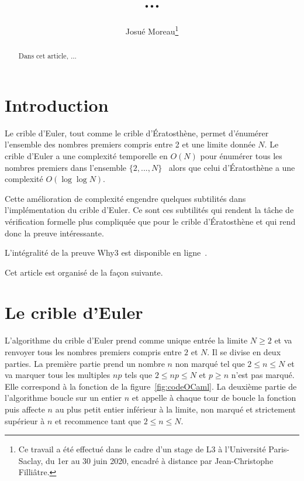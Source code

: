 \documentclass[a4paper]{easychair}
\begin{document}
\title{...}
\author{Josué Moreau\thanks{Ce travail a été effectué dans le cadre
    d'un stage de L3 à l'Université Paris-Saclay, du 1er au 30 juin
    2020, encadré à distance par Jean-Christophe Filliâtre.}}
\maketitle

\begin{abstract}
  Dans cet article, ...
\end{abstract}

\section{Introduction}


Le crible d'Euler, tout comme le crible d'Ératosthène, permet d'énumérer
l'ensemble des nombres premiers compris entre 2 et une limite donnée $N$.
Le crible d'Euler a une complexité temporelle en $O(N)$ pour énumérer tous les
nombres premiers dans l'ensemble $\{2,...,N\}$~\cite{crible-euler} alors que celui
d'Ératosthène a une complexité $O(\log\log N)$.

Cette amélioration de complexité engendre quelques subtilités dans l'implémentation
du crible d'Euler. Ce sont ces subtilités qui rendent la tâche de vérification
formelle plus compliquée que pour le crible d'Ératosthène et qui rend donc la
preuve intéressante.


L'intégralité de la preuve Why3 est disponible en ligne~\cite{mapreuve}.

Cet article est organisé de la façon suivante.

\section{Le crible d'Euler}


L'algorithme du crible d'Euler prend comme unique entrée la limite $N \geq 2$ et va
renvoyer tous les nombres premiers compris entre $2$ et $N$. Il se divise en
deux parties. La première partie prend un nombre $n$ non marqué
tel que $2 \leq n \leq N$ et va marquer tous les multiples $np$ tels que
$2 \leq np \leq N$ et $p \geq n$ n'est pas marqué. Elle correspond à la fonction
 de la figure~\ref{fig:codeOCaml}.
La deuxième partie de l'algorithme boucle sur un entier $n$ et appelle à chaque
tour de boucle la fonction  puis affecte $n$ au plus
petit entier inférieur à la limite, non marqué et strictement supérieur à $n$
et recommence tant que $2 \leq n \leq N$.
\end{document}
